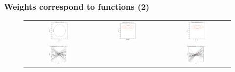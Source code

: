 \begin{frame}
\frametitle{Weights correspond to functions (2)}
\begin{figure}
\begin{tabular}{ccc}
    \includegraphics[width=0.3\textwidth]{images/plots/w_space_prior.pdf} &
    \includegraphics[width=0.3\textwidth]{images/plots/w_space_likelihood.pdf} &
    \includegraphics[width=0.3\textwidth]{images/plots/w_space_posterior.pdf} \\

    \includegraphics[width=0.3\textwidth]{images/plots/w_space_prior_models.pdf} & &
    \includegraphics[width=0.3\textwidth]{images/plots/w_space_posterior_sequence_002_posterior_models.pdf} \\
\end{tabular}
\end{figure}
\end{frame}

